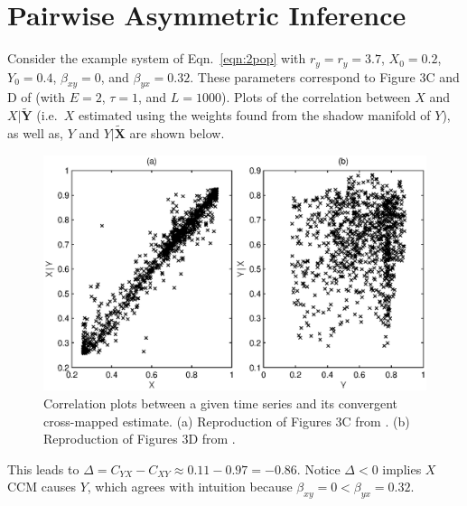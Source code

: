 \documentclass[twocolumn,aps,pre,groupedaddress]{revtex4-1}
\begin{document}
\section{Pairwise Asymmetric Inference}
\label{sec:PAI}

Consider the example system of Eqn.\ \ref{eqn:2pop} with $r_y=r_y=3.7$, $X_0 = 0.2$, $Y_0=0.4$, $\beta_{xy}=0$, and $\beta_{yx}=0.32$.  These parameters correspond to Figure 3C and D of \cite{Sugihara2012} (with $E=2$, $\tau=1$, and $L=1000$).  Plots of the correlation between $X$ and $X|\tilde{\mathbf{Y}}$ (i.e.\ $X$ estimated using the weights found from the shadow manifold of $Y$), as well as, $Y$ and $Y|\tilde{\mathbf{X}}$ are shown below.
\begin{figure}[ht]
\includegraphics[scale=0.55]{SugFig3CD.eps} 
\caption{Correlation plots between a given time series and its convergent cross-mapped estimate.  (a) Reproduction of Figures 3C from \cite{Sugihara2012}. (b) Reproduction of Figures 3D from \cite{Sugihara2012}.}
\label{fig:Sug3CDredo}
\end{figure}
This leads to $\Delta=C_{YX}-C_{XY}\approx 0.11 - 0.97 = -0.86$.  Notice $\Delta<0$ implies $X$ CCM causes $Y$, which agrees with intuition because $\beta_{xy}=0 < \beta_{yx} = 0.32$.
\end{document}
